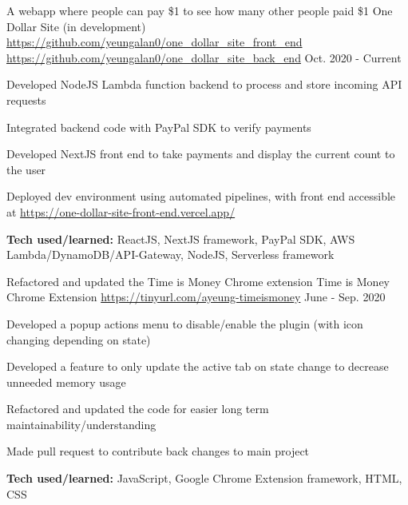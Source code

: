 \begin{cventries}
\vspace{-.25em}
\cventry
{A webapp where people can pay \$1 to see how many other people paid \$1} %
{One Dollar Site (in development)} %
{\href{https://github.com/yeungalan0/one\_dollar\_site\_front\_end}{https://github.com/yeungalan0/one\_dollar\_site\_front\_end} \href{https://github.com/yeungalan0/one\_dollar\_site\_back\_end}{https://github.com/yeungalan0/one\_dollar\_site\_back\_end}} %
{Oct. 2020 - Current} %
{ %
\begin{cvitems}
\item {Developed NodeJS Lambda function backend to process and store incoming API requests}
\item {Integrated backend code with PayPal SDK to verify payments}
\item {Developed NextJS front end to take payments and display the current count to the user}
\item {Deployed dev environment using automated pipelines, with front end accessible at \href{https://one-dollar-site-front-end.vercel.app/}{https://one-dollar-site-front-end.vercel.app/}}
\item {\textbf{Tech used/learned:} ReactJS, NextJS framework, PayPal SDK, AWS Lambda/DynamoDB/API-Gateway, NodeJS, Serverless framework}
\end{cvitems}
}


\vspace{-1em}
\cventry
{Refactored and updated the Time is Money Chrome extension} %
{Time is Money Chrome Extension} %
{\href{https://tinyurl.com/ayeung-timeismoney}{https://tinyurl.com/ayeung-timeismoney}} %
{June - Sep. 2020} %
{ %
\begin{cvitems}
\item {Developed a popup actions menu to disable/enable the plugin (with icon changing depending on state)}
\item {Developed a feature to only update the active tab on state change to decrease unneeded memory usage}
\item {Refactored and updated the code for easier long term maintainability/understanding}
\item {Made pull request to contribute back changes to main project}
\item {\textbf{Tech used/learned:} JavaScript, Google Chrome Extension framework, HTML, CSS}
\end{cvitems}
}


\end{cventries}
